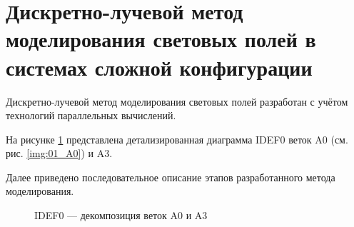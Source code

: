\section{Дискретно-лучевой метод моделирования световых полей в системах сложной конфигурации}

Дискретно-лучевой метод моделирования световых полей разработан с учётом технологий параллельных вычислений.

На рисунке \ref{img:02_A0_03_A3} представлена детализированная диаграмма IDEF0 веток A0 (см. рис. \ref{img:01_A0}) и A3.

Далее приведено последовательное описание этапов разработанного метода моделирования.

\begin{figure}[p]
	\captionsetup{justification=centering}
	\caption{IDEF0 — декомпозиция веток A0 и A3}
	\label{img:02_A0_03_A3}
\end{figure}

